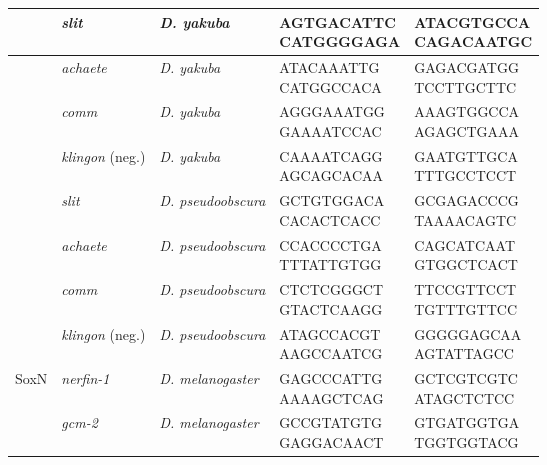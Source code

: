 \begin{center}
\begin{longtable}{|l|l|p{2.2cm}|p{3.3cm}|p{3.2cm}|}
         & \emph{slit}           & \emph{D. yakuba}        & \parbox[t]{3cm}{AGTGACATTC\\ CATGGGGAGA} & \parbox[t]{3cm}{ATACGTGCCA\\ CAGACAATGC} \\ \hline
         & \emph{achaete}        & \emph{D. yakuba}        & \parbox[t]{3cm}{ATACAAATTG\\ CATGGCCACA} & \parbox[t]{3cm}{GAGACGATGG\\ TCCTTGCTTC} \\ \hline
         & \emph{comm}           & \emph{D. yakuba}        & \parbox[t]{3cm}{AGGGAAATGG\\ GAAAATCCAC} & \parbox[t]{3cm}{AAAGTGGCCA\\ AGAGCTGAAA} \\ \hline
         & \emph{klingon} (neg.) & \emph{D. yakuba}        & \parbox[t]{3cm}{CAAAATCAGG\\ AGCAGCACAA} & \parbox[t]{3cm}{GAATGTTGCA\\ TTTGCCTCCT} \\ \hline
         & \emph{slit}           & \emph{D. pseudoobscura} & \parbox[t]{3cm}{GCTGTGGACA\\ CACACTCACC} & \parbox[t]{3cm}{GCGAGACCCG\\ TAAAACAGTC} \\ \hline
         & \emph{achaete}        & \emph{D. pseudoobscura} & \parbox[t]{3cm}{CCACCCCTGA\\ TTTATTGTGG} & \parbox[t]{3cm}{CAGCATCAAT\\ GTGGCTCACT} \\ \hline
         & \emph{comm}           & \emph{D. pseudoobscura} & \parbox[t]{3cm}{CTCTCGGGCT\\ GTACTCAAGG} & \parbox[t]{3cm}{TTCCGTTCCT\\ TGTTTGTTCC} \\ \hline
         & \emph{klingon} (neg.) & \emph{D. pseudoobscura} & \parbox[t]{3cm}{ATAGCCACGT\\ AAGCCAATCG} & \parbox[t]{3cm}{GGGGGAGCAA\\ AGTATTAGCC} \\ \hline
SoxN     & \emph{nerfin-1}       & \emph{D. melanogaster}  & \parbox[t]{3cm}{GAGCCCATTG\\ AAAAGCTCAG} & \parbox[t]{3cm}{GCTCGTCGTC\\ ATAGCTCTCC} \\ \hline
         & \emph{gcm-2}          & \emph{D. melanogaster}  & \parbox[t]{3cm}{GCCGTATGTG\\ GAGGACAACT} & \parbox[t]{3cm}{GTGATGGTGA\\ TGGTGGTACG} \\ \hline

\end{longtable}
\end{center}
